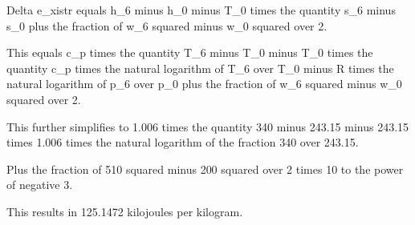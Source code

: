 Delta e_xistr equals h_6 minus h_0 minus T_0 times the quantity s_6 minus s_0 plus the fraction of w_6 squared minus w_0 squared over 2.

This equals c_p times the quantity T_6 minus T_0 minus T_0 times the quantity c_p times the natural logarithm of T_6 over T_0 minus R times the natural logarithm of p_6 over p_0 plus the fraction of w_6 squared minus w_0 squared over 2.

This further simplifies to 1.006 times the quantity 340 minus 243.15 minus 243.15 times 1.006 times the natural logarithm of the fraction 340 over 243.15.

Plus the fraction of 510 squared minus 200 squared over 2 times 10 to the power of negative 3.

This results in 125.1472 kilojoules per kilogram.